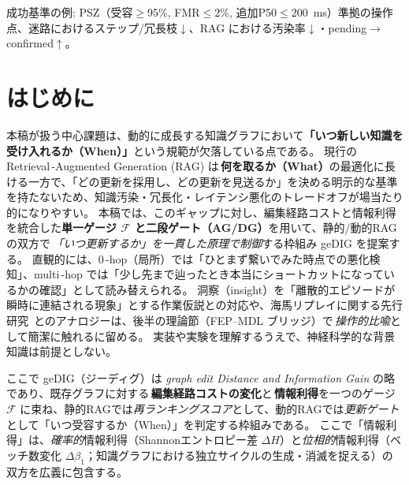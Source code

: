 \documentclass[ja=standard,xelatex]{bxjsarticle}
\newcommand{\F}{\mathcal{F}}
\begin{document}
\noindent 成功基準の例: PSZ（受容$\ge$95\%, FMR$\le$2\%, 追加P50$\le$\SI{200}{ms}）準拠の操作点、迷路におけるステップ/冗長枝$\downarrow$、RAG における汚染率$\downarrow$・pending$\to$confirmed$\uparrow$。

\section{はじめに}
本稿が扱う中心課題は、動的に成長する知識グラフにおいて\textbf{「いつ新しい知識を受け入れるか（When）」}という規範が欠落している点である。
現行の Retrieval\,\mbox{-}Augmented Generation (RAG) は\,\textbf{何を取るか（What）}の最適化に長ける一方で、「どの更新を採用し、どの更新を見送るか」を決める明示的な基準を持たないため、知識汚染・冗長化・レイテンシ悪化のトレードオフが場当たり的になりやすい。
本稿では、このギャップに対し、編集経路コストと情報利得を統合した\textbf{単一ゲージ $\F$ と二段ゲート（AG/DG）}を用いて、静的/動的RAGの双方で\,\emph{「いつ更新するか」を一貫した原理で制御}する枠組み geDIG を提案する。
直観的には、0\,\mbox{-}hop（局所）では「ひとまず繋いでみた時点での悪化検知」、multi\,\mbox{-}hop では「少し先まで辿ったとき本当にショートカットになっているかの確認」として読み替えられる。
洞察（insight）を「離散的エピソードが瞬時に連結される現象」とする作業仮説との対応や、海馬リプレイに関する先行研究\,\cite{Buzsaki2015,Carr2011,Pfeiffer2013} とのアナロジーは、後半の理論節（FEP--MDL ブリッジ）で\,\emph{操作的比喩}として簡潔に触れるに留める。
実装や実験を理解するうえで、神経科学的な背景知識は前提としない。

ここで geDIG（ジーディグ）は \textit{graph edit Distance and Information Gain} の略であり、既存グラフに対する\,\textbf{編集経路コストの変化}と\,\textbf{情報利得}を一つのゲージ $\F$ に束ね、静的RAGでは\emph{再ランキングスコア}として、動的RAGでは\emph{更新ゲート}として「いつ受容するか（When）」を判定する枠組みである。
ここで「情報利得」は、\emph{確率的}情報利得（Shannonエントロピー差 $\Delta H$）と\emph{位相的}情報利得（ベッチ数変化 $\Delta\beta_1$；知識グラフにおける独立サイクルの生成・消滅を捉える）の双方を広義に包含する。
\end{document}

